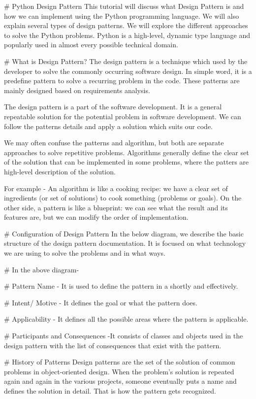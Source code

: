 # Python Design Pattern
This tutorial will discuss what Design Pattern is and how we can implement using the Python programming language. We will also explain several types of design patterns. We will explore the different approaches to solve the Python problems. Python
is a high-level, dynamic type language and popularly used in almost every possible technical domain.


# What is Design Pattern?
The design pattern is a technique which used by the developer to solve the commonly occurring software design. In simple word, it is a predefine pattern to solve a recurring problem in the code. These patterns are mainly designed based on requirements analysis.

The design pattern is a part of the software development. It is a general repeatable solution for the potential problem in software development. We can follow the patterns details and apply a solution which suits our code.

We may often confuse the patterns and algorithm, but both are separate approaches to solve repetitive problems. Algorithms generally define the clear set of the solution that can be implemented in some problems, where the patters are high-level description of the solution.


For example - An algorithm is like a cooking recipe: we have a clear set of ingredients (or set of solutions) to cook something (problems or goals). On the other side, a pattern is like a blueprint: we can see what the result and its features are, but we can modify the order of implementation.

# Configuration of Design Pattern
In the below diagram, we describe the basic structure of the design pattern documentation. It is focused on what technology we are using to solve the problems and in what ways.

# In the above diagram-

# Pattern Name - It is used to define the pattern in a shortly and effectively.

 # Intent/ Motive - It defines the goal or what the pattern does.

 # Applicability - It defines all the possible areas where the pattern is applicable.

 # Participants and Consequences -It consists of classes and objects used in the design pattern with the list of consequences that exist with the pattern.


 # History of Patterns
Design patterns are the set of the solution of common problems in object-oriented design. When the problem's solution is repeated again and again in the various projects, someone eventually puts a name and defines the solution in detail. That is how the pattern gets recognized.


